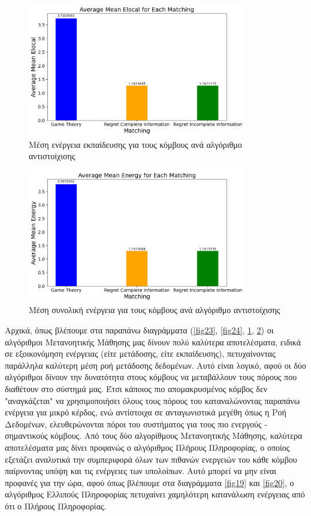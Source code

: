 \newpage

\begin{figure}[H]
    \centering
    \includegraphics[width=0.85\textwidth]{figures/chapter4/Average_Mean_Elocal.png}
    \caption{Μέση ενέργεια εκπαίδευσης για τους κόμβους ανά αλγόριθμο αντιστοίχισης}
    \label{fig25}
\end{figure}

\begin{figure}[H]
    \centering
    \includegraphics[width=0.85\textwidth]{figures/chapter4/Average_Mean_Energy.png}
    \caption{Μέση συνολική ενέργεια για τους κόμβους ανά αλγόριθμο αντιστοίχισης}
    \label{fig26}
\end{figure}

Αρχικά, όπως βλέπουμε στα παραπάνω διαγράμματα (\ref{fig23}, \ref{fig24}, \ref{fig25}, \ref{fig26}) οι αλγόριθμοι Μετανοητικής Μάθησης μας δίνουν πολύ καλύτερα αποτελέσματα, ειδικά σε εξοικονόμηση ενέργειας (είτε μετάδοσης, είτε εκπαίδευσης), πετυχαίνοντας παράλληλα καλύτερη μέση ροή μετάδοσης δεδομένων. Αυτό είναι λογικό, αφού οι δύο αλγόριθμοι δίνουν την δυνατότητα στους κόμβους να μεταβάλλουν τους πόρους που διαθέτουν στο σύστημά μας. Έτσι κάποιος πιο απομακρυσμένος κόμβος δεν "αναγκάζεται" να χρησιμοποιήσει όλους τους πόρους του καταναλώνοντας παραπάνω ενέργεια για μικρό κέρδος, ενώ αντίστοιχα σε ανταγωνιστικά μεγέθη όπως η Ροή Δεδομένων, ελευθερώνονται πόροι του συστήματος για τους πιο ενεργούς - σημαντικούς κόμβους. Από τους δύο αλγορίθμους Μετανοητικής Μάθησης, καλύτερα αποτελέσματα μας δίνει προφανώς ο αλγόριθμος Πλήρους Πληροφορίας, ο οποίος εξετάζει αναλυτικά την συμπεριφορά όλων των πιθανών ενεργειών του κάθε κόμβου παίρνοντας υπόψη και τις ενέργειες των υπολοίπων. Αυτό μπορεί να μην είναι προφανές για την ώρα, αφού όπως βλέπουμε στα διαγράμματα \ref{fig19} και \ref{fig20}, ο αλγόριθμος Ελλιπούς Πληροφορίας πετυχαίνει χαμηλότερη κατανάλωση ενέργειας από ότι ο Πλήρους Πληροφορίας.

